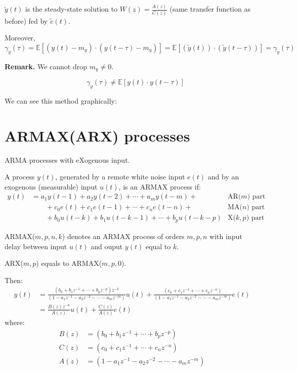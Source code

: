 $\tilde{y}(t)$ is the steady-state solution to $W(z)=\frac{A(z)}{C(z)}$ (same transfer function as before) fed by $\tilde{e}(t)$.

Moreover,
$$
\gamma_{y}(\tau)=\mathbb{E}\left[\left(y(t)-m_{y}\right) \cdot\left(y(t-\tau)-m_{y}\right)\right]=\mathbb{E}[(\tilde{y}(t)) \cdot(\tilde{y}(t-\tau))]=\gamma_{\tilde{y}}(\tau)
$$

\textbf{Remark.} We cannot drop $m_{y} \neq 0$.

$$\quad \gamma_{y}(\tau) \neq \mathbb{E}[y(t) \cdot y(t-\tau)]$$

We can see this method graphically:


\section{ARMAX(ARX) processes}
ARMA processes with eXogenous input.

A process $y(t)$, generated by a remote white noise input $e(t)$ and by an exogenous (measurable) input $u(t)$, is an ARMAX process if:
\begin{align*}
	y(t)&=a_{1} y(t-1)+a_{2} y(t-2)+\cdots+a_{m} y(t-m)+ &\text{AR($m$) part}\\
	&\qquad+c_{0} e(t)+c_{1} e(t-1)+\cdots+c_{n} e(t-n)+ &\text{MA($n$) part} \\
	&\qquad+b_{0} u(t-k)+b_{1} u(t-k-1)+\cdots+b_{p} u(t-k-p)  &\text{X($k,p$) part}
\end{align*}

ARMAX($m,p,n,k$) denotes an ARMAX process of orders $m,p,n$ with input delay between input $u(t)$ and ouput $y(t)$ equal to $k$.

ARX($m,p$) equals to ARMAX($m,p,0$).

Then:
\begin{align*}
	y(t) &= \frac{\left(b_{0}+b_{1} z^{-1}+\cdots+b_{p} z^{-p}\right) z^{-k}}{\left(1-a_{1} z^{-1}-a_{2} z^{-2}-\cdots-a_{m} z^{-m}\right)} u(t)+\frac{\left(c_{0}+c_{1} z^{-1}+\cdots+c_{n} z^{-n}\right)}{\left(1-a_{1} z^{-1}-a_{2} z^{-2}-\cdots-a_{m} z^{-m}\right)} e(t)\\
	&=\frac{B(z) z^{-k}}{A(z)} u(t)+\frac{C(z)}{A(z)} e(t)
\end{align*}
where:
\begin{align*}
	B(z) &= \left(b_{0}+b_{1} z^{-1}+\cdots+b_{p} z^{-p}\right)\\
	C(z) &= \left(c_{0}+c_{1} z^{-1}+\cdots+c_{n} z^{-n}\right)\\
	A(z) &= \left(1-a_{1} z^{-1}-a_{2} z^{-2}-\cdots-a_{m} z^{-m}\right)
\end{align*}

